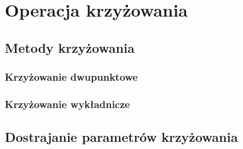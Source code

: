 \chapter{Operacja krzyżowania}\label{cha:pierwszyDokument}


\section{Metody krzyżowania}\label{sec:strukturaDokumentu}

\subsection{Krzyżowanie dwupunktowe}\label{sec:strukturaDokumentu}


\subsection{Krzyżowanie wykładnicze}\label{sec:kompilacja}


\section{Dostrajanie parametrów krzyżowania}\label{sec:strukturaDokumentu}
